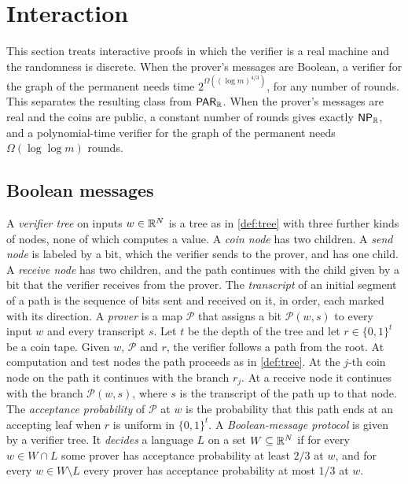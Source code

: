 \section{Interaction}\label{sec:interaction}

This section treats interactive proofs in which the verifier is a real machine and the randomness is discrete.
When the prover's messages are Boolean, a verifier for the graph of the permanent needs time $2^{\Omega((\log m)^{4/3})}$, for any number of rounds.
This separates the resulting class from $\textsf{\upshape PAR}_{\mathbb{R}}$.
When the prover's messages are real and the coins are public, a constant number of rounds gives exactly $\textsf{\upshape NP}_{\mathbb{R}}$, and a polynomial-time verifier for the graph of the permanent needs $\Omega(\log\log m)$ rounds.

\subsection{Boolean messages}

\begin{definition}\label{def:bip}
A \emph{verifier tree} on inputs $w\in\mathbb{R}^N$ is a tree as in \cref{def:tree} with three further kinds of nodes, none of which computes a value.
A \emph{coin node} has two children.
A \emph{send node} is labeled by a bit, which the verifier sends to the prover, and has one child.
A \emph{receive node} has two children, and the path continues with the child given by a bit that the verifier receives from the prover.
The \emph{transcript} of an initial segment of a path is the sequence of bits sent and received on it, in order, each marked with its direction.
A \emph{prover} is a map $\mathcal P$ that assigns a bit $\mathcal P(w,s)$ to every input $w$ and every transcript $s$.
Let $t$ be the depth of the tree and let $r\in\{0,1\}^t$ be a coin tape.
Given $w$, $\mathcal P$ and $r$, the verifier follows a path from the root.
At computation and test nodes the path proceeds as in \cref{def:tree}.
At the $j$-th coin node on the path it continues with the branch $r_j$.
At a receive node it continues with the branch $\mathcal P(w,s)$, where $s$ is the transcript of the path up to that node.
The \emph{acceptance probability} of $\mathcal P$ at $w$ is the probability that this path ends at an accepting leaf when $r$ is uniform in $\{0,1\}^t$.
A \emph{Boolean-message protocol} is given by a verifier tree.
It \emph{decides} a language $L$ on a set $W\subseteq\mathbb{R}^N$ if for every $w\in W\cap L$ some prover has acceptance probability at least $2/3$ at $w$, and for every $w\in W\setminus L$ every prover has acceptance probability at most $1/3$ at $w$.
\end{definition}

